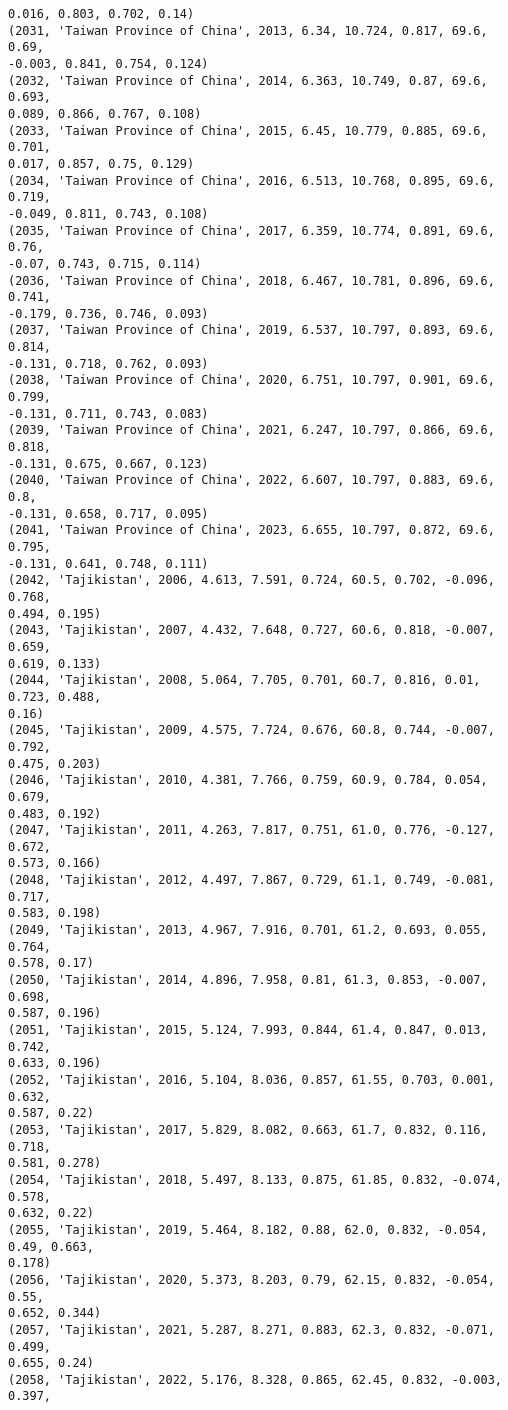 \documentclass[11pt]{article}
\begin{document}
\begin{Verbatim}[commandchars=\\\{\}]
0.016, 0.803, 0.702, 0.14)
(2031, 'Taiwan Province of China', 2013, 6.34, 10.724, 0.817, 69.6, 0.69,
-0.003, 0.841, 0.754, 0.124)
(2032, 'Taiwan Province of China', 2014, 6.363, 10.749, 0.87, 69.6, 0.693,
0.089, 0.866, 0.767, 0.108)
(2033, 'Taiwan Province of China', 2015, 6.45, 10.779, 0.885, 69.6, 0.701,
0.017, 0.857, 0.75, 0.129)
(2034, 'Taiwan Province of China', 2016, 6.513, 10.768, 0.895, 69.6, 0.719,
-0.049, 0.811, 0.743, 0.108)
(2035, 'Taiwan Province of China', 2017, 6.359, 10.774, 0.891, 69.6, 0.76,
-0.07, 0.743, 0.715, 0.114)
(2036, 'Taiwan Province of China', 2018, 6.467, 10.781, 0.896, 69.6, 0.741,
-0.179, 0.736, 0.746, 0.093)
(2037, 'Taiwan Province of China', 2019, 6.537, 10.797, 0.893, 69.6, 0.814,
-0.131, 0.718, 0.762, 0.093)
(2038, 'Taiwan Province of China', 2020, 6.751, 10.797, 0.901, 69.6, 0.799,
-0.131, 0.711, 0.743, 0.083)
(2039, 'Taiwan Province of China', 2021, 6.247, 10.797, 0.866, 69.6, 0.818,
-0.131, 0.675, 0.667, 0.123)
(2040, 'Taiwan Province of China', 2022, 6.607, 10.797, 0.883, 69.6, 0.8,
-0.131, 0.658, 0.717, 0.095)
(2041, 'Taiwan Province of China', 2023, 6.655, 10.797, 0.872, 69.6, 0.795,
-0.131, 0.641, 0.748, 0.111)
(2042, 'Tajikistan', 2006, 4.613, 7.591, 0.724, 60.5, 0.702, -0.096, 0.768,
0.494, 0.195)
(2043, 'Tajikistan', 2007, 4.432, 7.648, 0.727, 60.6, 0.818, -0.007, 0.659,
0.619, 0.133)
(2044, 'Tajikistan', 2008, 5.064, 7.705, 0.701, 60.7, 0.816, 0.01, 0.723, 0.488,
0.16)
(2045, 'Tajikistan', 2009, 4.575, 7.724, 0.676, 60.8, 0.744, -0.007, 0.792,
0.475, 0.203)
(2046, 'Tajikistan', 2010, 4.381, 7.766, 0.759, 60.9, 0.784, 0.054, 0.679,
0.483, 0.192)
(2047, 'Tajikistan', 2011, 4.263, 7.817, 0.751, 61.0, 0.776, -0.127, 0.672,
0.573, 0.166)
(2048, 'Tajikistan', 2012, 4.497, 7.867, 0.729, 61.1, 0.749, -0.081, 0.717,
0.583, 0.198)
(2049, 'Tajikistan', 2013, 4.967, 7.916, 0.701, 61.2, 0.693, 0.055, 0.764,
0.578, 0.17)
(2050, 'Tajikistan', 2014, 4.896, 7.958, 0.81, 61.3, 0.853, -0.007, 0.698,
0.587, 0.196)
(2051, 'Tajikistan', 2015, 5.124, 7.993, 0.844, 61.4, 0.847, 0.013, 0.742,
0.633, 0.196)
(2052, 'Tajikistan', 2016, 5.104, 8.036, 0.857, 61.55, 0.703, 0.001, 0.632,
0.587, 0.22)
(2053, 'Tajikistan', 2017, 5.829, 8.082, 0.663, 61.7, 0.832, 0.116, 0.718,
0.581, 0.278)
(2054, 'Tajikistan', 2018, 5.497, 8.133, 0.875, 61.85, 0.832, -0.074, 0.578,
0.632, 0.22)
(2055, 'Tajikistan', 2019, 5.464, 8.182, 0.88, 62.0, 0.832, -0.054, 0.49, 0.663,
0.178)
(2056, 'Tajikistan', 2020, 5.373, 8.203, 0.79, 62.15, 0.832, -0.054, 0.55,
0.652, 0.344)
(2057, 'Tajikistan', 2021, 5.287, 8.271, 0.883, 62.3, 0.832, -0.071, 0.499,
0.655, 0.24)
(2058, 'Tajikistan', 2022, 5.176, 8.328, 0.865, 62.45, 0.832, -0.003, 0.397,

\end{Verbatim}
\end{document}
